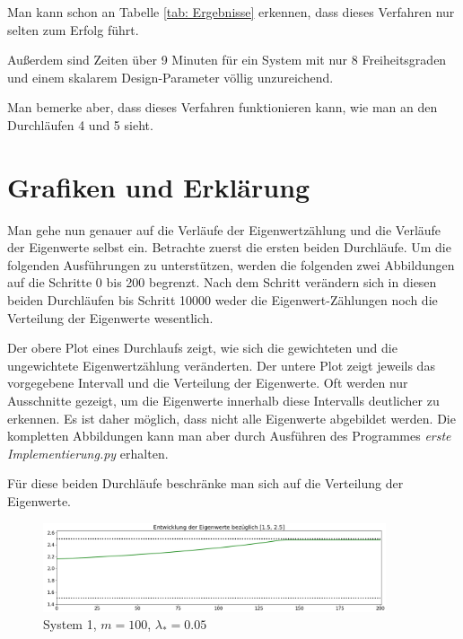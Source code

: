 \documentclass[a4paper,12pt]{report}
\newcommand{\1}{\mathds{1}}
\theoremstyle{plain} %
\theoremstyle{definition} %
\theoremstyle{remark}
\begin{document}
            Man kann schon an Tabelle \ref{tab: Ergebnisse} erkennen, dass dieses Verfahren nur selten zum Erfolg führt.

            Außerdem sind Zeiten über 9 Minuten für ein System mit nur 8 Freiheitsgraden und einem skalarem Design-Parameter völlig unzureichend.

            Man bemerke aber, dass dieses Verfahren funktionieren kann, wie man an den Durchläufen 4 und 5 sieht.

      \section{Grafiken und Erklärung}
            Man gehe nun genauer auf die Verläufe der Eigenwertzählung und die Verläufe der Eigenwerte selbst ein.
            Betrachte zuerst die ersten beiden Durchläufe.
            Um die folgenden Ausführungen zu unterstützen, werden die folgenden zwei Abbildungen auf die Schritte 0 bis 200 begrenzt.
            Nach dem Schritt verändern sich in diesen beiden Durchläufen bis Schritt 10000 weder die Eigenwert-Zählungen noch die Verteilung der Eigenwerte wesentlich.

            Der obere Plot eines Durchlaufs zeigt, wie sich die gewichteten und die ungewichtete Eigenwertzählung veränderten.
            Der untere Plot zeigt jeweils das vorgegebene Intervall und die Verteilung der Eigenwerte.
            Oft werden nur Ausschnitte gezeigt, um die Eigenwerte innerhalb diese Intervalls deutlicher zu erkennen.
            Es ist daher möglich, dass nicht alle Eigenwerte abgebildet werden.
            Die kompletten Abbildungen kann man aber durch Ausführen des Programmes \textit{erste Implementierung.py} erhalten.
            
            Für diese beiden Durchläufe beschränke man sich auf die Verteilung der Eigenwerte.
            \begin{figure}[h!t]
                  \centering
                  \includegraphics[width=0.9\textwidth, keepaspectratio]{./Original/Plot_1_100_0.05.png}
                  \caption{System 1, $m=100$, $\lambda_*=0.05$}
                  \label{fig: Plot_1_100_0.05}
            \end{figure}
\end{document}
